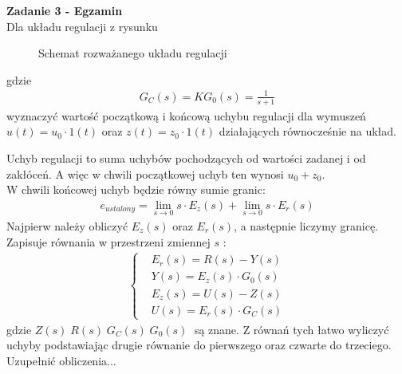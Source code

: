 \documentclass[a4paper,11pt]{article}
\begin{document}
\newpage
\begin{framed}
\textbf{Zadanie 3 - Egzamin} \\
Dla układu regulacji z rysunku
\begin{figure}[H]
\centering
{}
\caption{Schemat rozważanego układu regulacji}
\label{fig:opt_par_1}
\end{figure}
gdzie 
\begin{align*}
G_C(s)=KG_0(s)=\frac{1}{s+1}
\end{align*}
wyznaczyć wartość początkową i końcową uchybu regulacji dla wymuszeń \( u(t) = u_0 \cdot 1(t) \) oraz \( z(t) = z_0 \cdot 1(t) \) działających równocześnie na układ. 
\end{framed}

Uchyb regulacji to suma uchybów pochodzących od wartości zadanej i od zakłóceń. A więc w chwili początkowej uchyb ten wynosi \( u_0 + z_0 \). \\
W chwili końcowej uchyb będzie równy sumie granic:
\begin{align*}
e_{ustalony}=\lim_{s\rightarrow 0}s\cdot E_z(s) +  \lim_{s\rightarrow 0}s\cdot E_r(s) 
\end{align*}
Najpierw należy obliczyć \( E_z(s) \) oraz \( E_r(s) \), a następnie liczymy granicę. \\
Zapisuje równania w przestrzeni zmiennej \( s \) : \\
\begin{align*}
\begin{cases}
&E_r(s)=R(s) - Y(s) \\
&Y(s) = E_z(s)\cdot G_0(s) \\
&E_z(s) = U(s)-Z(s) \\
&U(s) = E_r(s) \cdot G_C(s)
\end{cases}
\end{align*}
gdzie \( Z(s) \; R(s) \; G_C(s) \; G_0(s) \; \) są znane. Z równań tych łatwo wyliczyć uchyby podstawiając drugie równanie do pierwszego oraz czwarte do trzeciego.  \\
Uzupełnić obliczenia...
\end{document}
